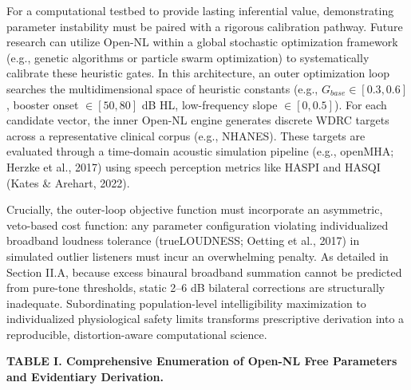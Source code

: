 \documentclass[
  12pt,
]{article}
\begin{document}
For a computational testbed to provide lasting inferential value,
demonstrating parameter instability must be paired with a rigorous
calibration pathway. Future research can utilize Open-NL within a global
stochastic optimization framework (e.g., genetic algorithms or particle
swarm optimization) to systematically calibrate these heuristic gates.
In this architecture, an outer optimization loop searches the
multidimensional space of heuristic constants (e.g.,
\(G_{base} \in [0.3, 0.6]\), booster onset \(\in [50, 80]\) dB HL,
low-frequency slope \(\in [0, 0.5]\)). For each candidate vector, the
inner Open-NL engine generates discrete WDRC targets across a
representative clinical corpus (e.g., NHANES). These targets are
evaluated through a time-domain acoustic simulation pipeline (e.g.,
openMHA; Herzke et al., 2017) using speech perception metrics like HASPI
and HASQI (Kates \& Arehart, 2022).

Crucially, the outer-loop objective function must incorporate an
asymmetric, veto-based cost function: any parameter configuration
violating individualized broadband loudness tolerance (trueLOUDNESS;
Oetting et al., 2017) in simulated outlier listeners must incur an
overwhelming penalty. As detailed in Section II.A, because excess
binaural broadband summation cannot be predicted from pure-tone
thresholds, static 2--6 dB bilateral corrections are structurally
inadequate. Subordinating population-level intelligibility maximization
to individualized physiological safety limits transforms prescriptive
derivation into a reproducible, distortion-aware computational science.

\textbf{TABLE I. Comprehensive Enumeration of Open-NL Free Parameters
and Evidentiary Derivation.}
\end{document}
